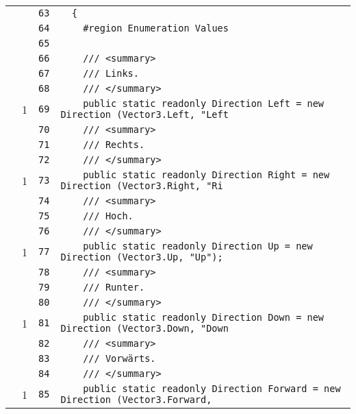 \documentclass[a4paper,10pt]{article}
\begin{document}
\begin{longtable}[l]{lrrl}
\cellcolor{gray} &  & \verb~63~ & \verb~  {~\\
\cellcolor{gray} &  & \verb~64~ & \verb~    #region Enumeration Values~\\
\cellcolor{gray} &  & \verb~65~ & \verb~~\\
\cellcolor{gray} &  & \verb~66~ & \verb~    /// <summary>~\\
\cellcolor{gray} &  & \verb~67~ & \verb~    /// Links.~\\
\cellcolor{gray} &  & \verb~68~ & \verb~    /// </summary>~\\
\cellcolor{green} & 1 & \verb~69~ & \verb~    public static readonly Direction Left = new Direction (Vector3.Left, "Left~\\
\cellcolor{gray} &  & \verb~70~ & \verb~    /// <summary>~\\
\cellcolor{gray} &  & \verb~71~ & \verb~    /// Rechts.~\\
\cellcolor{gray} &  & \verb~72~ & \verb~    /// </summary>~\\
\cellcolor{green} & 1 & \verb~73~ & \verb~    public static readonly Direction Right = new Direction (Vector3.Right, "Ri~\\
\cellcolor{gray} &  & \verb~74~ & \verb~    /// <summary>~\\
\cellcolor{gray} &  & \verb~75~ & \verb~    /// Hoch.~\\
\cellcolor{gray} &  & \verb~76~ & \verb~    /// </summary>~\\
\cellcolor{green} & 1 & \verb~77~ & \verb~    public static readonly Direction Up = new Direction (Vector3.Up, "Up");~\\
\cellcolor{gray} &  & \verb~78~ & \verb~    /// <summary>~\\
\cellcolor{gray} &  & \verb~79~ & \verb~    /// Runter.~\\
\cellcolor{gray} &  & \verb~80~ & \verb~    /// </summary>~\\
\cellcolor{green} & 1 & \verb~81~ & \verb~    public static readonly Direction Down = new Direction (Vector3.Down, "Down~\\
\cellcolor{gray} &  & \verb~82~ & \verb~    /// <summary>~\\
\cellcolor{gray} &  & \verb~83~ & \verb~    /// Vorwärts.~\\
\cellcolor{gray} &  & \verb~84~ & \verb~    /// </summary>~\\
\cellcolor{green} & 1 & \verb~85~ & \verb~    public static readonly Direction Forward = new Direction (Vector3.Forward,~\\

\end{longtable}
\end{document}
